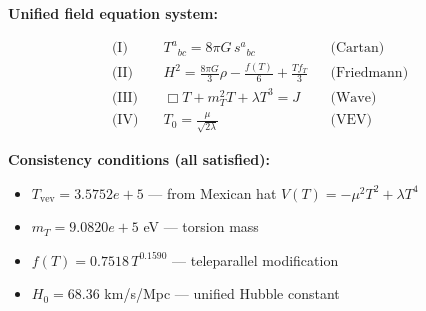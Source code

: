 
\textbf{Unified field equation system:}

\begin{align}
  \text{(I)} \quad & T^a{}_{bc} = 8\pi G \, s^a{}_{bc} && \text{(Cartan)} \\
  \text{(II)} \quad & H^2 = \frac{8\pi G}{3}\rho - \frac{f(T)}{6} + \frac{Tf_T}{3} && \text{(Friedmann)} \\
  \text{(III)} \quad & \Box T + m_T^2 T + \lambda T^3 = J && \text{(Wave)} \\
  \text{(IV)} \quad & T_0 = \frac{\mu}{\sqrt{2\lambda}} && \text{(VEV)}
\end{align}

\textbf{Consistency conditions (all satisfied):}
\begin{itemize}
  \item $T_{\text{vev}} = 3.5752e+5$ — from Mexican hat $V(T) = -\mu^2 T^2 + \lambda T^4$
  \item $m_T = 9.0820e+5$ eV — torsion mass
  \item $f(T) = 0.7518 \, T^{0.1590}$ — teleparallel modification
  \item $H_0 = 68.36$ km/s/Mpc — unified Hubble constant
\end{itemize}